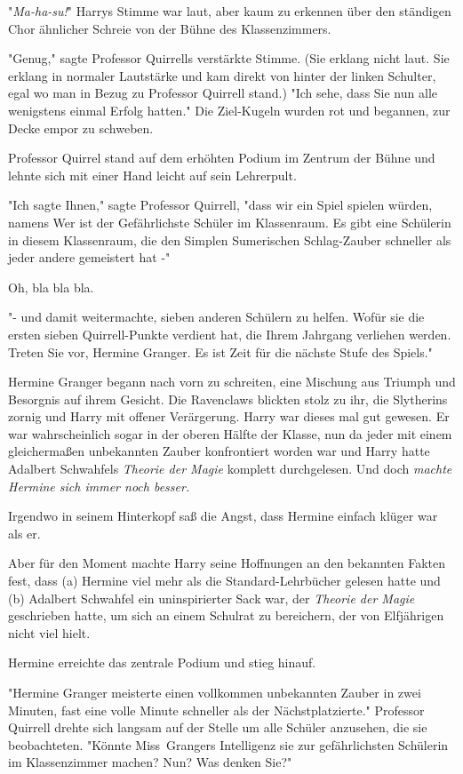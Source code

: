 {"\emph{Ma-ha-su!}" Harrys Stimme war laut, aber kaum zu erkennen über den ständigen Chor ähnlicher Schreie von der Bühne des Klassenzimmers.

"Genug," sagte Professor Quirrells verstärkte Stimme. (Sie erklang nicht laut. Sie erklang in normaler Lautstärke und kam direkt von hinter der linken Schulter, egal wo man in Bezug zu Professor Quirrell stand.) "Ich sehe, dass Sie nun alle wenigstens einmal Erfolg hatten." Die Ziel-Kugeln wurden rot und begannen, zur Decke empor zu schweben.

Professor Quirrel stand auf dem erhöhten Podium im Zentrum der Bühne und lehnte sich mit einer Hand leicht auf sein Lehrerpult.

"Ich sagte Ihnen," sagte Professor Quirrell, "dass wir ein Spiel spielen würden, namens Wer ist der Gefährlichste Schüler im Klassenraum. Es gibt eine Schülerin in diesem Klassenraum, die den Simplen Sumerischen Schlag-Zauber schneller als jeder andere gemeistert hat -"

Oh, bla bla bla.

"- und damit weitermachte, sieben anderen Schülern zu helfen. Wofür sie die ersten sieben Quirrell-Punkte verdient hat, die Ihrem Jahrgang verliehen werden. Treten Sie vor, Hermine Granger. Es ist Zeit für die nächste Stufe des Spiels."

Hermine Granger begann nach vorn zu schreiten, eine Mischung aus Triumph und Besorgnis auf ihrem Gesicht. Die Ravenclaws blickten stolz zu ihr, die Slytherins zornig und Harry mit offener Verärgerung. Harry war dieses mal gut gewesen. Er war wahrscheinlich sogar in der oberen Hälfte der Klasse, nun da jeder mit einem gleichermaßen unbekannten Zauber konfrontiert worden war und Harry hatte Adalbert Schwahfels \emph{Theorie der Magie} komplett durchgelesen. Und doch \emph{machte Hermine sich immer noch besser.}

Irgendwo in seinem Hinterkopf saß die Angst, dass Hermine einfach klüger war als er.

Aber für den Moment machte Harry seine Hoffnungen an den bekannten Fakten fest, dass (a) Hermine viel mehr als die Standard-Lehrbücher gelesen hatte und (b) Adalbert Schwahfel ein uninspirierter Sack war, der \emph{Theorie der Magie} geschrieben hatte, um sich an einem Schulrat zu bereichern, der von Elfjährigen nicht viel hielt.

Hermine erreichte das zentrale Podium und stieg hinauf.

"Hermine Granger meisterte einen vollkommen unbekannten Zauber in zwei Minuten, fast eine volle Minute schneller als der Nächstplatzierte." Professor Quirrell drehte sich langsam auf der Stelle um alle Schüler anzusehen, die sie beobachteten. "Könnte Miss~Grangers Intelligenz sie zur gefährlichsten Schülerin im Klassenzimmer machen? Nun? Was denken Sie?"

}
